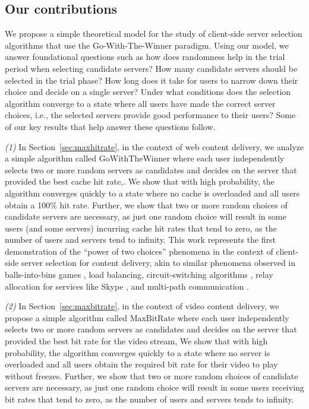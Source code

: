 \documentclass[conference]{IEEEtran}
\begin{document}
\subsection{Our contributions}
 We propose a simple theoretical model for the study of client-side server selection algorithms that use the  Go-With-The-Winner paradigm. Using our model, we answer foundational questions such as how does randomness help in the trial period when selecting candidate servers? How many candidate servers should be selected in the trial phase? How long does it take for users to narrow down their choice and decide on a single server? Under what conditions does the selection algorithm converge to a state where all users have made the correct server choices, i.e., the selected servers provide good performance to their users? Some of our key results that help answer these questions follow.

{\em (1)}  In Section~\ref{sec:maxhitrate}, in the context of web content delivery, we analyze a simple algorithm called $\textrm{GoWithTheWinner}$ where each user independently selects two or more random servers as candidates and decides on the server that provided the best cache hit rate,. We show that with high probability, the algorithm converges quickly to a state where no cache is overloaded and all users obtain a 100\% hit rate. Further, we show that  two or more random choices of candidate servers are necessary, as just one random choice will result in some users (and some servers) incurring cache hit rates that tend to zero, as the number of users and servers tend to infinity. This work represents the first demonstration of the ``power of two choices''  phenomena in the context of client-side server selection for content delivery,  akin to similar phenomena observed in balls-into-bins games \cite{mitzenmacherRS2001}, load balancing,  circuit-switching algorithms \cite{cole1998randomized}, relay allocation for services like Skype \cite{Nguyen:2008}, and multi-path communication \cite{Peter:2007}. 

{\em (2)}   In Section~\ref{sec:maxbitrate}, in the context of video content delivery, we propose a simple algorithm called $\textrm{MaxBitRate}$ where each user independently selects two or more random servers as candidates and decides on the server that provided the best bit rate for the video stream,  We show that with high probability, the algorithm converges quickly to a state where no server is overloaded and all users obtain the required bit rate for their video to play without freezes. Further, we show that two or more random choices of candidate servers are necessary, as just one random choice will result in some users receiving bit rates that tend to zero, as the number of users and servers tends to infinity. 
\end{document}
